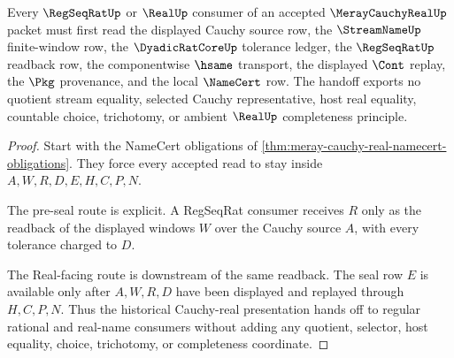 \begin{theorem}
\label{thm:meray-cauchy-real-regseqrat-handoff}
Every $\RegSeqRatUp$ or $\RealUp$ consumer of an accepted $\MerayCauchyRealUp$ packet must first read the displayed Cauchy source row, the $\StreamNameUp$ finite-window row, the $\DyadicRatCoreUp$ tolerance ledger, the $\RegSeqRatUp$ readback row, the componentwise $\hsame$ transport, the displayed $\Cont$ replay, the $\Pkg$ provenance, and the local $\NameCert$ row. The handoff exports no quotient stream equality, selected Cauchy representative, host real equality, countable choice, trichotomy, or ambient $\RealUp$ completeness principle.
\end{theorem}
\begin{proof}
Start with the NameCert obligations of \autoref{thm:meray-cauchy-real-namecert-obligations}. They force every accepted read to stay inside $A,W,R,D,E,H,C,P,N$.

The pre-seal route is explicit. A RegSeqRat consumer receives $R$ only as the readback of the displayed windows $W$ over the Cauchy source $A$, with every tolerance charged to $D$.

The Real-facing route is downstream of the same readback. The seal row $E$ is available only after $A,W,R,D$ have been displayed and replayed through $H,C,P,N$. Thus the historical Cauchy-real presentation hands off to regular rational and real-name consumers without adding any quotient, selector, host equality, choice, trichotomy, or completeness coordinate.
\end{proof}


\begin{closurestatus}{\MerayCauchyRealUp}
  \theoryclosure{\seedClosure}
  \formalstatus{\unformalizedV}
\end{closurestatus}
